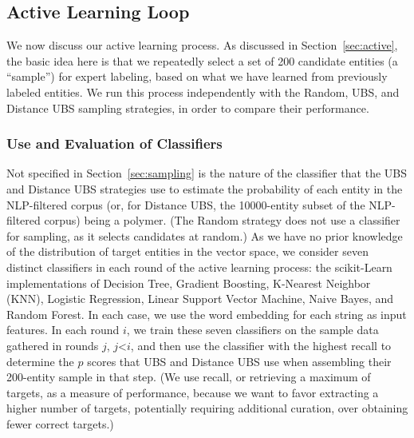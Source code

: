 \subsection{Active Learning Loop}\label{active_learning_loop}
We now discuss our active learning process. 
As discussed in Section~\ref{sec:active}, the basic idea here is that we repeatedly select a set of 200
candidate entities (a ``sample'') for expert labeling, 
based on what we have learned from previously labeled entities.
We run this process independently with the Random, UBS, and Distance UBS sampling strategies,
in order to compare their performance.

\subsubsection{Use and Evaluation of Classifiers}
Not specified in Section~\ref{sec:sampling} is the nature of the classifier that the UBS and Distance UBS strategies
use to estimate the probability of each entity in the NLP-filtered corpus (or, for Distance UBS,
the \num{10000}-entity subset of the NLP-filtered corpus) being a polymer.
(The Random strategy does not use a classifier for sampling, as it selects candidates at random.)
As we have no prior knowledge of the distribution of target entities in the vector space, 
we consider seven distinct classifiers in each round of the active learning process:
the scikit-Learn~\cite{scikit-learn} implementations of Decision Tree,
Gradient Boosting,
K-Nearest Neighbor (KNN), 
Logistic Regression, 
Linear Support Vector Machine,
Naive Bayes, 
and Random Forest. %
In each case, we use the word embedding for each string as input features.
In each round $i$, we train these seven classifiers on the sample data gathered in rounds $j$, $j$<$i$,
and then use the classifier with the highest recall to determine the $p$ scores that UBS and Distance UBS use when
assembling their 200-entity sample in that step.
(We use recall, or retrieving a maximum of targets, as a measure of performance, because we want to favor
extracting a higher number of targets, potentially requiring additional curation, over obtaining fewer correct targets.)

